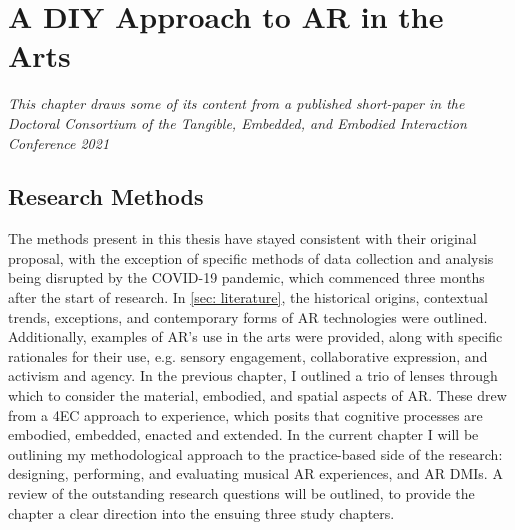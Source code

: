 \chapter{A DIY Approach to AR in the Arts}
\label{sec: method}
\epigraph{\emph{This chapter draws some of its content from a published short-paper in the Doctoral Consortium of the Tangible, Embedded, and Embodied Interaction Conference 2021}}{\cite[]{bilbow2021b}}
\section{Research Methods}\label{sec: method-methods} %
The methods present in this thesis have stayed consistent with their original proposal, with the exception of specific methods of data collection and analysis being disrupted by the COVID-19 pandemic, which commenced three months after the start of research. 
In \autoref{sec: literature}, the historical origins, contextual trends, exceptions, and contemporary forms of AR technologies were outlined. Additionally, examples of AR's use in the arts were provided, along with specific rationales for their use, e.g. sensory engagement, collaborative expression, and activism and agency. In the previous chapter, I outlined a trio of lenses through which to consider the material, embodied, and spatial aspects of AR. These drew from a 4EC approach to experience, which posits that cognitive processes are embodied, embedded, enacted and extended. In the current chapter I will be outlining my methodological approach to the practice-based side of the research: designing, performing, and evaluating musical AR experiences, and AR DMIs. A review of the outstanding research questions will be outlined, to provide the chapter a clear direction into the ensuing three study chapters.

\begin{enumerate}
    \RQmedium
    \RQexperience
    \RQfuture
\end{enumerate}

